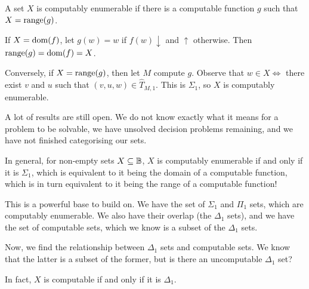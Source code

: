 \documentclass{article}
\begin{document}
\begin{proposition}
	A set $X$ is computably enumerable if there is a computable function $g$ such that $X = \operatorname{range}(g)$.
\end{proposition}

\begin{prf}
	If $X = \operatorname{dom}(f)$, let $g(w) = w$ if $f(w)\downarrow$ and $\uparrow$ otherwise. Then $\operatorname{range}(g) = \operatorname{dom}(f) = X$.
	    
	Conversely, if $X = \operatorname{range}(g)$, then let $M$ compute $g$. Observe that $w \in X \iff $ there exist $v$ and $u$ such that $(v, u, w) \in \hat T_{M,1}$. This is $\Sigma_1$, so $X$ is computably enumerable.
\end{prf}

A lot of results are still open. We do not know exactly what it means for a problem to be solvable, we have unsolved decision problems remaining, and we have not finished categorising our sets.

In general, for non-empty sets $X \subseteq \mathbb{B}$, $X$ is computably enumerable if and only if it is $\Sigma_1$, which is equivalent to it being the domain of a computable function, which is in turn equivalent to it being the range of a computable function!

This is a powerful base to build on. We have the set of $\Sigma_1$ and $\Pi_1$ sets, which are computably enumerable. We also have their overlap (the $\Delta_1$ sets), and we have the set of computable sets, which we know is a subset of the $\Delta_1$ sets.

Now, we find the relationship between $\Delta_1$ sets and computable sets. We know that the latter is a subset of the former, but is there an uncomputable $\Delta_1$ set?

\begin{proposition}
	In fact, $X$ is computable if and only if it is $\Delta_1$.
\end{proposition}
\end{document}
